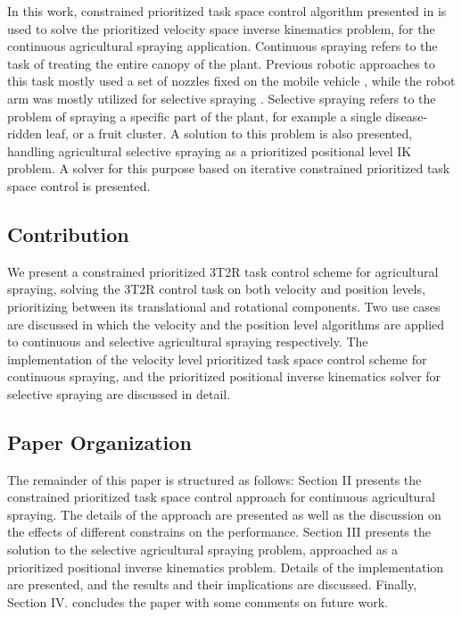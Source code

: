 In this work, constrained prioritized task space control algorithm presented in \cite{deLasa2010} is used to solve the prioritized velocity space inverse kinematics problem, for the continuous agricultural spraying application. Continuous spraying refers to the task of treating the entire canopy of the plant. Previous robotic approaches to this task mostly used a set of nozzles fixed on the mobile vehicle \cite{Berenstein2010, Berenstein2019, Cantelli2019}, while the robot arm was mostly utilized for selective spraying \cite{Oberti2013, Oberti2016}. Selective spraying refers to the problem of spraying a specific part of the plant, for example a single disease-ridden leaf, or a fruit cluster. A solution to this problem is also presented, handling agricultural selective spraying as a prioritized positional level IK problem. A solver for this purpose based on iterative constrained prioritized task space control is presented. 

\subsection{Contribution}
We present a constrained prioritized 3T2R task control scheme for agricultural spraying, solving the 3T2R control task on both velocity and position levels, prioritizing between its translational and rotational components. Two use cases are discussed in which the velocity and the position level algorithms are applied to continuous and selective agricultural spraying respectively. The implementation of the velocity level prioritized task space control scheme for continuous spraying, and the prioritized positional inverse kinematics solver for selective spraying are discussed in detail. 

\subsection{Paper Organization}
The remainder of this paper is structured as follows: Section II presents the constrained prioritized task space control approach for continuous agricultural spraying. The details of the approach are presented as well as the discussion on the effects of different constrains on the performance. Section III presents the solution to the selective agricultural spraying problem, approached as a prioritized positional inverse kinematics problem. Details of the implementation are presented, and the results and their implications are discussed. Finally, Section IV. concludes the paper with some comments on future work.  